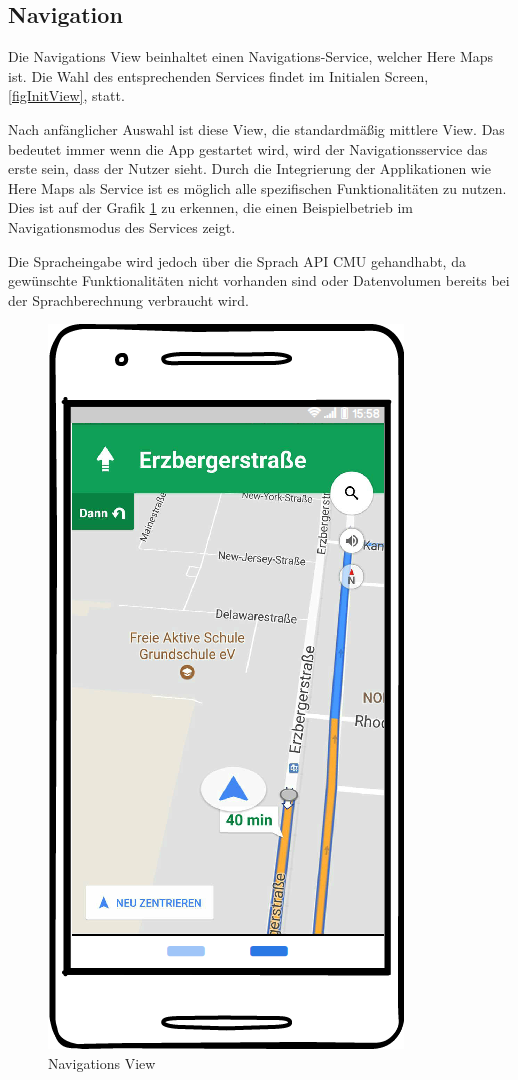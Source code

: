 \subsection{Navigation}
Die Navigations View beinhaltet einen Navigations-Service, welcher Here Maps ist. Die Wahl des entsprechenden Services findet im Initialen Screen, \ref{figInitView}, statt. 

Nach anfänglicher Auswahl ist diese View, die standardmäßig mittlere View. Das bedeutet immer wenn die App gestartet wird, wird der Navigationsservice das erste sein, dass der Nutzer sieht. Durch die Integrierung der Applikationen wie Here Maps als Service ist es möglich alle spezifischen Funktionalitäten zu nutzen. Dies ist auf der Grafik \ref{figNavigation} zu erkennen, die einen Beispielbetrieb im Navigationsmodus des Services zeigt.

Die Spracheingabe wird jedoch über die Sprach API \ac{CMU} gehandhabt, da gewünschte Funktionalitäten nicht vorhanden sind oder Datenvolumen bereits bei der Sprachberechnung verbraucht wird. 

\begin{figure}[h]
	\centering
  \includegraphics[scale=0.5]{images/Navigation.png}
	\caption{Navigations View}
	\label{figNavigation}
\end{figure}

